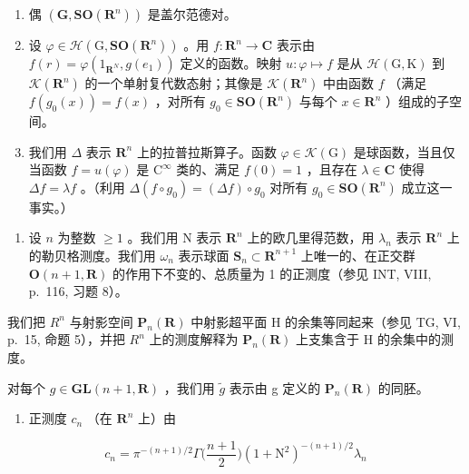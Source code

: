 \begin{enumerate}
\def\labelenumi{\alph{enumi})}
\item
  偶 \((\mathbf{G},\mathbf{SO}(\mathbf{R}^n))\) 是盖尔范德对。
\item
  设 \(\varphi \in \mathcal{H}(\mathrm{G},\mathbf{SO}(\mathbf{R}^n))\) 。用 \(f\colon \mathbf{R}^n\to \mathbf{C}\) 表示由 \(f(r) = \varphi (1_{\mathbf{R}^N},g(e_1))\) 定义的函数。映射 \(u\colon \varphi \mapsto f\) 是从 \(\mathcal{H}(\mathrm{G},\mathrm{K})\) 到 \(\mathcal{K}(\mathbf{R}^n)\) 的一个单射复代数态射；其像是 \(\mathcal{K}(\mathbf{R}^n)\) 中由函数 \(f\) （满足 \(f(g_0(x)) = f(x)\) ，对所有 \(g_0\in \mathbf{SO}(\mathbf{R}^n)\) 与每个 \(x\in \mathbf{R}^n\) ）组成的子空间。
\item
  我们用 \(\Delta\) 表示 \(\mathbf{R}^n\) 上的拉普拉斯算子。函数 \(\varphi \in \mathcal{K}(\mathrm{G})\) 是球函数，当且仅当函数 \(f = u(\varphi)\) 是 \(\mathrm{C}^{\infty}\) 类的、满足 \(f(0) = 1\) ，且存在 \(\lambda \in \mathbf{C}\) 使得 \(\Delta f = \lambda f\) 。（利用 \(\Delta(f \circ g_0) = (\Delta f) \circ g_0\) 对所有 \(g_0 \in \mathbf{SO}(\mathbf{R}^n)\) 成立这一事实。）
\end{enumerate}

\begin{enumerate}
\def\labelenumi{\arabic{enumi})}
\setcounter{enumi}{30}
\tightlist
\item
  设 \(n\) 为整数 \(\geqslant 1\) 。我们用 N 表示 \(\mathbf{R}^n\) 上的欧几里得范数，用 \(\lambda_n\) 表示 \(\mathbf{R}^n\) 上的勒贝格测度。我们用 \(\omega_n\) 表示球面 \(\mathbf{S}_n \subset \mathbf{R}^{n+1}\) 上唯一的、在正交群 \(\mathbf{O}(n+1, \mathbf{R})\) 的作用下不变的、总质量为 1 的正测度（参见 INT, VIII, p.~116, 习题 8）。
\end{enumerate}

我们把 \(R^{n}\) 与射影空间 \(\mathbf{P}_{n}(\mathbf{R})\) 中射影超平面 H 的余集等同起来（参见 TG, VI, p.~15, 命题 5），并把 \(R^{n}\) 上的测度解释为 \(\mathbf{P}_{n}(\mathbf{R})\) 上支集含于 H 的余集中的测度。

对每个 \(g \in \mathbf{GL}(n+1, \mathbf{R})\) ，我们用 \(\widetilde{g}\) 表示由 g 定义的 \(\mathbf{P}_{n}(\mathbf{R})\) 的同胚。

\begin{enumerate}
\def\labelenumi{\alph{enumi})}
\tightlist
\item
  正测度 \(c_{n}\) （在 \(\mathbf{R}^n\) 上）由
\end{enumerate}

\[
c _ {n} = \pi^ {- (n + 1) / 2} \Gamma \Big (\frac {n + 1}{2} \Big) (1 + \mathrm{N} ^ {2}) ^ {- (n + 1) / 2} \lambda_ {n}
\]

